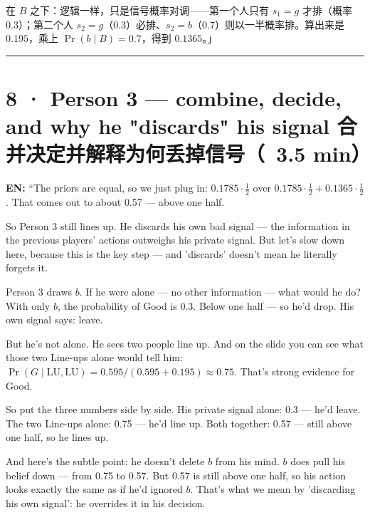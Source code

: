 \documentclass[11pt]{article}
\begin{document}
在 \(B\) 之下：逻辑一样，只是信号概率对调——第一个人只有 \(s_1=g\) 才排（概率 \(0.3\)）；第二个人 \(s_2=g\)（\(0.3\)）必排、\(s_2=b\)（\(0.7\)）则以一半概率排。算出来是 \(0.195\)，乘上 \(\Pr(b\mid B)=0.7\)，得到 \(0.1365\)。」\par

\vspace{0.35em}\noindent\rule{\textwidth}{0.3pt}\par

\section*{8 · Person 3 — combine, decide, and why he "discards" his signal 合并决定并解释为何丢掉信号（~3.5 min）}

\textbf{EN:} “The priors are equal, so we just plug in: \(0.1785\cdot\tfrac12\) over \(0.1785\cdot\tfrac12+0.1365\cdot\tfrac12\). That comes out to about 0.57 — above one half.\par

So Person 3 still lines up. He discards his own bad signal — the information in the previous players' actions outweighs his private signal. But let's slow down here, because this is the key step — and 'discards' doesn't mean he literally forgets it.\par

Person 3 draws \(b\). If he were alone — no other information — what would he do? With only \(b\), the probability of Good is 0.3. Below one half — so he'd drop. His own signal says: leave.\par

But he's not alone. He sees two people line up. And on the slide you can see what those two Line-ups alone would tell him: \(\Pr(G\mid \mathrm{LU},\mathrm{LU})=0.595/(0.595+0.195)\approx 0.75\). That's strong evidence for Good.\par

So put the three numbers side by side. His private signal alone: 0.3 — he'd leave. The two Line-ups alone: 0.75 — he'd line up. Both together: 0.57 — still above one half, so he lines up.\par

And here's the subtle point: he doesn't delete \(b\) from his mind. \(b\) does pull his belief down — from 0.75 to 0.57. But 0.57 is still above one half, so his action looks exactly the same as if he'd ignored \(b\). That's what we mean by 'discarding his own signal': he overrides it in his decision.\par
\end{document}
